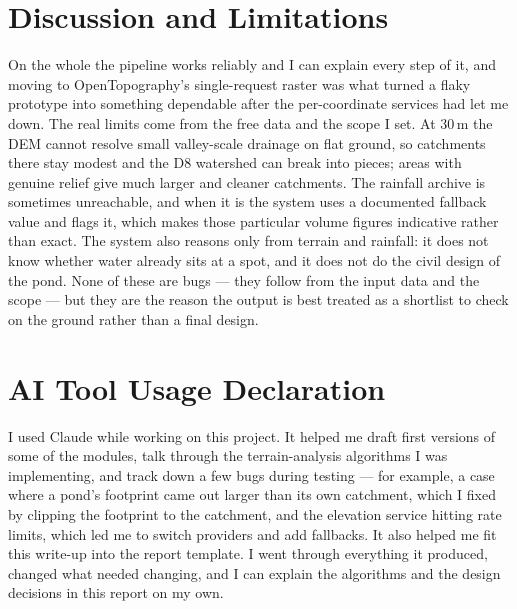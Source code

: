 \documentclass[manuscript,screen]{acmart}
\begin{document}
\section{Discussion and Limitations}
\label{sec:discussion}
On the whole the pipeline works reliably and I can explain every step of it, and
moving to OpenTopography's single-request raster was what turned a flaky prototype
into something dependable after the per-coordinate services had let me down. The
real limits come from the free data and the scope I set. At 30\,m the DEM cannot
resolve small valley-scale drainage on flat ground, so catchments there stay modest
and the D8 watershed can break into pieces; areas with genuine relief give much
larger and cleaner catchments. The rainfall archive is sometimes unreachable, and
when it is the system uses a documented fallback value and flags it, which makes
those particular volume figures indicative rather than exact. The system also
reasons only from terrain and rainfall: it does not know whether water already sits
at a spot, and it does not do the civil design of the pond. None of
these are bugs --- they follow from the input data and the scope --- but they are
the reason the output is best treated as a shortlist to check on the ground rather
than a final design.

\section{AI Tool Usage Declaration}
\label{sec:ai-usage}
I used Claude while working on this project. It helped me draft first versions of
some of the modules, talk through the terrain-analysis algorithms I was
implementing, and track down a few bugs during testing --- for example, a case where
a pond's footprint came out larger than its own catchment, which I fixed by clipping
the footprint to the catchment, and the elevation service hitting rate limits, which
led me to switch providers and add fallbacks. It also helped me fit this write-up
into the report template. I went through everything it produced, changed what needed
changing, and I can explain the algorithms and the design decisions in this report
on my own.

\appendix
\end{document}
